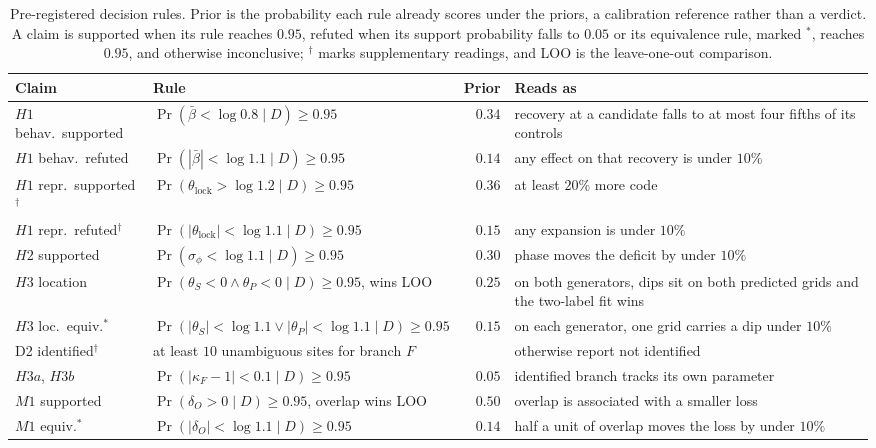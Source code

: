 \begin{table}[!t]
    \centering
\small
    \setlength{\tabcolsep}{4pt}
    \begin{tabular}{@{}llrM{4.7cm}@{}}
        \toprule
        \textbf{Claim} & \textbf{Rule} & \textbf{Prior} & \textbf{Reads as} \\
        \midrule
        $H1$ behav.\ supported & $\Pr(\bar\beta < \log 0.8 \mid D) \ge 0.95$   & $0.34$ & recovery at a candidate falls to at most four fifths of its controls \\
        \rowsep%
        $H1$ behav.\ refuted   & $\Pr(|\bar\beta| < \log 1.1 \mid D) \ge 0.95$ & $0.14$ & any effect on that recovery is under $10\%$ \\
        \rowsep%
        $H1$ repr.\ supported$^{\dagger}$  & $\Pr(\theta_{\mathrm{lock}} > \log 1.2 \mid D) \ge 0.95$   & $0.36$ & at least $20\%$ more code \\
        \rowsep%
        $H1$ repr.\ refuted$^{\dagger}$    & $\Pr(|\theta_{\mathrm{lock}}| < \log 1.1 \mid D) \ge 0.95$ & $0.15$ & any expansion is under $10\%$ \\
        \rowsep%
        $H2$ supported & $\Pr(\sigma_\phi < \log 1.1 \mid D) \ge 0.95$ & $0.30$ & phase moves the deficit by under $10\%$ \\
        \rowsep%
        $H3$ location  & $\Pr(\theta_S<0\wedge\theta_P<0\mid D)\ge0.95$, wins LOO & $0.25$ & on both generators, dips sit on both predicted grids and the two-label fit wins \\
        \rowsep%
        $H3$ loc.\ equiv.$^{*}$ & $\Pr(|\theta_S|<\log 1.1 \lor |\theta_P|<\log 1.1 \mid D) \ge 0.95$ & $0.15$ & on each generator, one grid carries a dip under $10\%$ \\
        \rowsep%
        D2 identified$^{\dagger}$  & at least $10$ unambiguous sites for branch $F$ &  & otherwise report not identified \\
        \rowsep%
        $H3a$, $H3b$   & $\Pr(|\kappa_F - 1| < 0.1 \mid D) \ge 0.95$   & $0.05$ & identified branch tracks its own parameter \\
        \rowsep%
        $M1$ supported & $\Pr(\delta_O > 0 \mid D) \ge 0.95$, overlap wins LOO & $0.50$ & overlap is associated with a smaller loss \\
        \rowsep%
        $M1$ equiv.$^{*}$ & $\Pr(|\delta_O| < \log 1.1 \mid D) \ge 0.95$ & $0.14$ & half a unit of overlap moves the loss by under $10\%$ \\
        \bottomrule
    \end{tabular}
\caption{Pre-registered decision rules. Prior is the probability each rule already scores under the priors, a calibration reference rather than a verdict. A claim is supported when its rule reaches $0.95$, refuted when its support probability falls to $0.05$ or its equivalence rule, marked $^{*}$, reaches $0.95$, and otherwise inconclusive; $^{\dagger}$ marks supplementary readings, and LOO is the leave-one-out comparison.}%
    \label{tab:bayesDecisions}
\end{table}
